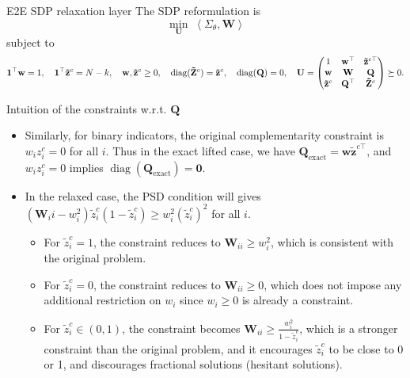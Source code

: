 \documentclass[10pt,aspectratio=169]{beamer}
\newcommand{\Nassets}{N}
\newcommand{\Kcard}{k}
\newcommand{\Param}{\theta}
\newcommand{\SigmaMat}{\Sigma}
\newcommand{\diagv}{\operatorname{diag}}
\begin{document}
\begin{frame}{E2E SDP relaxation layer}
   \footnotesize
  The SDP reformulation is
  \[
    \min_\mathbf{U} \; \left\langle \SigmaMat_\Param, \mathbf{W} \right\rangle
  \]
  subject to
  \[
  \begin{aligned}
    \one^\top \mathbf{w} =1,\quad \one^\top \mathbf{\tilde z}^c=\Nassets-\Kcard, \quad \mathbf{w}, \mathbf{\tilde z}^c \ge 0, \quad 
    \diagv(\mathbf{\tilde Z}^c) =\mathbf{\tilde z}^c, 
    \quad
    \diagv(\mathbf{Q})=0,\quad
    \mathbf{U}  =
    \begin{pmatrix}
      1 & \mathbf{w}^\top & \mathbf{\tilde z}^{c\top}\\
      \mathbf{w} & \mathbf{W} & \mathbf{Q}\\
      \mathbf{\tilde z}^c & \mathbf{Q}^\top & \mathbf{\tilde Z}^c
    \end{pmatrix}   \succeq 0.
  \end{aligned}
  \]

  \begin{block}{\small Intuition of the constraints w.r.t. $\mathbf{Q}$ }
    \footnotesize
    \begin{itemize}
      \item Similarly, for binary indicators, the original complementarity constraint is $w_i z_i^c = 0$ for all $i$. Thus in the exact lifted case, we have $\mathbf{Q}_{\text{exact}} = \mathbf{w}\mathbf{\tilde z}^{c\top}$, and $w_i z_i^c = 0$ implies $\diagv(\mathbf{Q}_{\text{exact}}) = \mathbf{0}$. 
      \item In the relaxed case, the PSD condition will gives $({\mathbf{W}_ii} - w_i^2) {\tilde z^c_i} (1-\tilde z^c_i) \geq w_i^2 (\tilde z_i^c)^2$ for all $i$. 
      \begin{itemize}
        \footnotesize
        \item For $\tilde z^c_i = 1$, the constraint reduces to $\mathbf{W}_{ii} \geq w_i^2$, which is consistent with the original problem. 
        \item For $\tilde z^c_i = 0$, the constraint reduces to $\mathbf{W}_{ii} \geq 0$, which does not impose any additional restriction on $w_i$ since $w_i \geq 0$ is already a constraint.
        \item For $\tilde z^c_i \in (0,1)$, the constraint becomes $\mathbf{W}_{ii} \geq \frac{w_i^2}{1 - \tilde z_i^c}$, which is a stronger constraint than the original problem, and it encourages $\tilde z_i^c$ to be close to 0 or 1, and discourages fractional solutions (hesitant solutions).
      \end{itemize}
    \end{itemize}
  \end{block}

\end{frame}
\end{document}
